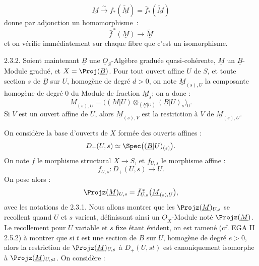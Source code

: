 
\[
  \underline{M}\xrightarrow{\sim} f_*(\widetilde{\underline{M}})=\bar f_*(\widetilde{\underline{M}})
\]
donne par adjonction un homomorphisme~:
\[
  \bar f^{\,*}(\underline{M})\longrightarrow \widetilde{\underline{M}}
\]
et on vérifie immédiatement sur chaque fibre que c'est un isomorphisme.

2.3.2. Soient maintenant \(\underline{B}\) une \(\underline{O}_S\)-Algèbre graduée quasi-cohérente, \(\underline{M}\) un \(\underline{B}\)-Module gradué, et \(X=\Proj(\underline{B})\). Pour tout ouvert affine \(U\) de \(S\), et toute section \(s\) de \(\underline{B}\) sur \(U\), homogène de degré \(d>0\), on note \(\underline{M}_{(s),U}\) la composante homogène de degré \(0\) du Module de fraction \(\underline{M}_s\); on a donc :
\[
  \underline{M}_{(s),U}=
  \bigl((\underline{M}|U)\otimes_{(\underline{B}|U)}(\underline{B}|U)_s\bigr)_0 .
\]
Si \(V\) est un ouvert affine de \(U\), alors \(\underline{M}_{(s),V}\) est la restriction à \(V\) de \(\underline{M}_{(s),U}\).

On considère la base d'ouverts de \(X\) formée des ouverts affines :
\[
  D_+(U,s)\simeq \Spec\bigl((\underline{B}|U)_{(s)}\bigr) .
\]
On note \(f\) le morphisme structural \(X\to S\), et \(f_{U,s}\) le morphisme affine :
\[
  f_{U,s}:D_+(U,s)\longrightarrow U .
\]
On pose alors :
\[
  \Projz(\underline{M})_{U,s}
  =
  \bar f_{U,s}^{\,*}\bigl(\underline{M}_{(s),U}\bigr),
\]
avec les notations de 2.3.1. Nous allons montrer que les \(\Projz(\underline{M})_{U,s}\) se recollent quand \(U\) et \(s\) varient, définissant ainsi un \(\underline{O}_X\)-Module noté \(\Projz(\underline{M})\). Le recollement pour \(U\) variable et \(s\) fixe étant évident, on est ramené (cf. EGA II 2.5.2) à montrer que si \(t\) est une section de \(\underline{B}\) sur \(U\), homogène de degré \(e>0\), alors la restriction de \(\Projz(\underline{M})_{U,s}\) à \(D_+(U,st)\) est canoniquement isomorphe à \(\Projz(\underline{M})_{U,st}\). On considère :
